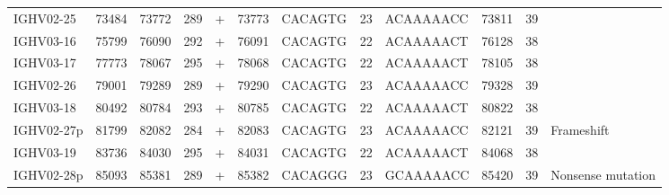 \begin{tabular}{lrrrlrlllrrl}
  IGHV02-25 & 73484 & 73772 & 289 & + & 73773 & CACAGTG & 23 & ACAAAAACC & 73811 & 39 &  \\ 
  IGHV03-16 & 75799 & 76090 & 292 & + & 76091 & CACAGTG & 22 & ACAAAAACT & 76128 & 38 &  \\ 
  IGHV03-17 & 77773 & 78067 & 295 & + & 78068 & CACAGTG & 22 & ACAAAAACT & 78105 & 38 &  \\ 
  IGHV02-26 & 79001 & 79289 & 289 & + & 79290 & CACAGTG & 23 & ACAAAAACC & 79328 & 39 &  \\ 
  IGHV03-18 & 80492 & 80784 & 293 & + & 80785 & CACAGTG & 22 & ACAAAAACT & 80822 & 38 &  \\ 
  IGHV02-27p & 81799 & 82082 & 284 & + & 82083 & CACAGTG & 23 & ACAAAAACC & 82121 & 39 & Frameshift \\ 
  IGHV03-19 & 83736 & 84030 & 295 & + & 84031 & CACAGTG & 22 & ACAAAAACT & 84068 & 38 &  \\ 
  IGHV02-28p & 85093 & 85381 & 289 & + & 85382 & CACAGGG & 23 & GCAAAAACC & 85420 & 39 & Nonsense mutation \\ 
   \bottomrule \end{tabular}
